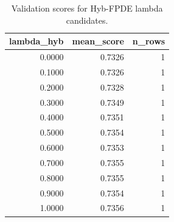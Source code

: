 \begin{table}[t]
\caption{Validation scores for Hyb-FPDE lambda candidates.}
\label{tab:lambda_distribution_computed}
\centering
\begin{tabular}{rrr}
\toprule
lambda\_hyb & mean\_score & n\_rows \\
\midrule
0.0000 & 0.7326 & 1 \\
0.1000 & 0.7326 & 1 \\
0.2000 & 0.7328 & 1 \\
0.3000 & 0.7349 & 1 \\
0.4000 & 0.7351 & 1 \\
0.5000 & 0.7354 & 1 \\
0.6000 & 0.7353 & 1 \\
0.7000 & 0.7355 & 1 \\
0.8000 & 0.7355 & 1 \\
0.9000 & 0.7354 & 1 \\
1.0000 & 0.7356 & 1 \\
\bottomrule
\end{tabular}

\end{table}
